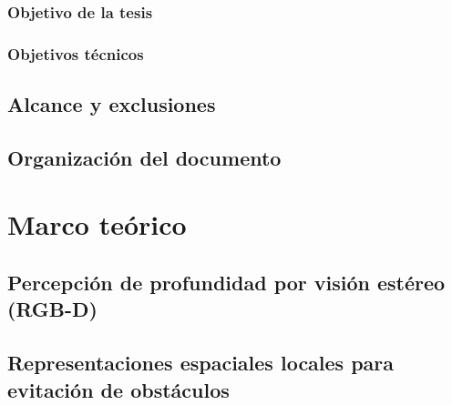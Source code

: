 \subsection{Objetivo de la tesis}

\subsection{Objetivos técnicos}

\section{Alcance y exclusiones}

\section{Organización del documento}

\chapter{Marco teórico}

\section{Percepción de profundidad por visión estéreo (RGB-D)}

\section{Representaciones espaciales locales para evitación de obstáculos}

